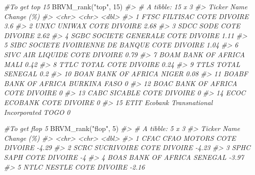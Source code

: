 \documentclass[
]{article}
\newenvironment{Shaded}{\begin{snugshade}}{\end{snugshade}}
\newcommand{\CommentTok}[1]{\textcolor[rgb]{0.56,0.35,0.01}{\textit{#1}}}
\newcommand{\DecValTok}[1]{\textcolor[rgb]{0.00,0.00,0.81}{#1}}
\newcommand{\FunctionTok}[1]{\textcolor[rgb]{0.00,0.00,0.00}{#1}}
\newcommand{\NormalTok}[1]{#1}
\newcommand{\StringTok}[1]{\textcolor[rgb]{0.31,0.60,0.02}{#1}}
\begin{document}
\begin{Shaded}
\begin{Highlighting}[]
\CommentTok{\#To get top 15}
\FunctionTok{BRVM\_rank}\NormalTok{(}\StringTok{"top"}\NormalTok{, }\DecValTok{15}\NormalTok{)}
\CommentTok{\#\textgreater{} \# A tibble: 15 x 3}
\CommentTok{\#\textgreater{}    Ticker Name                                       \textasciigrave{}Change (\%)\textasciigrave{}}
\CommentTok{\#\textgreater{}    \textless{}chr\textgreater{}  \textless{}chr\textgreater{}                                             \textless{}dbl\textgreater{}}
\CommentTok{\#\textgreater{}  1 FTSC   FILTISAC COTE D\textquotesingle{}IVOIRE                             3.6 }
\CommentTok{\#\textgreater{}  2 UNXC   UNIWAX COTE D\textquotesingle{}IVOIRE                               2.68}
\CommentTok{\#\textgreater{}  3 SDCC   SODE COTE D\textquotesingle{}IVOIRE                                 2.62}
\CommentTok{\#\textgreater{}  4 SGBC   SOCIETE GENERALE COTE D\textquotesingle{}IVOIRE                     1.11}
\CommentTok{\#\textgreater{}  5 SIBC   SOCIETE IVOIRIENNE DE BANQUE COTE D\textquotesingle{}IVOIRE         1.04}
\CommentTok{\#\textgreater{}  6 SIVC   AIR LIQUIDE COTE D\textquotesingle{}IVOIRE                          0.79}
\CommentTok{\#\textgreater{}  7 BOAM   BANK OF AFRICA MALI                                0.42}
\CommentTok{\#\textgreater{}  8 TTLC   TOTAL COTE D\textquotesingle{}IVOIRE                                0.24}
\CommentTok{\#\textgreater{}  9 TTLS   TOTAL SENEGAL                                      0.2 }
\CommentTok{\#\textgreater{} 10 BOAN   BANK OF AFRICA NIGER                               0.08}
\CommentTok{\#\textgreater{} 11 BOABF  BANK OF AFRICA BURKINA FASO                        0   }
\CommentTok{\#\textgreater{} 12 BOAC   BANK OF AFRICA COTE D\textquotesingle{}IVOIRE                       0   }
\CommentTok{\#\textgreater{} 13 CABC   SICABLE COTE D\textquotesingle{}IVOIRE                              0   }
\CommentTok{\#\textgreater{} 14 ECOC   ECOBANK COTE D\textquotesingle{}IVOIRE                              0   }
\CommentTok{\#\textgreater{} 15 ETIT   Ecobank Transnational Incorporated TOGO            0}

\CommentTok{\#To get flop 5}
\FunctionTok{BRVM\_rank}\NormalTok{(}\StringTok{"flop"}\NormalTok{, }\DecValTok{5}\NormalTok{)}
\CommentTok{\#\textgreater{} \# A tibble: 5 x 3}
\CommentTok{\#\textgreater{}   Ticker Name                      \textasciigrave{}Change (\%)\textasciigrave{}}
\CommentTok{\#\textgreater{}   \textless{}chr\textgreater{}  \textless{}chr\textgreater{}                            \textless{}dbl\textgreater{}}
\CommentTok{\#\textgreater{} 1 CFAC   CFAO MOTORS COTE D\textquotesingle{}IVOIRE        {-}4.29}
\CommentTok{\#\textgreater{} 2 SCRC   SUCRIVOIRE COTE D\textquotesingle{}IVOIRE         {-}4.23}
\CommentTok{\#\textgreater{} 3 SPHC   SAPH COTE D\textquotesingle{}IVOIRE               {-}4   }
\CommentTok{\#\textgreater{} 4 BOAS   BANK OF AFRICA SENEGAL           {-}3.97}
\CommentTok{\#\textgreater{} 5 NTLC   NESTLE COTE D\textquotesingle{}IVOIRE             {-}2.16}
\end{Highlighting}
\end{Shaded}
\end{document}

